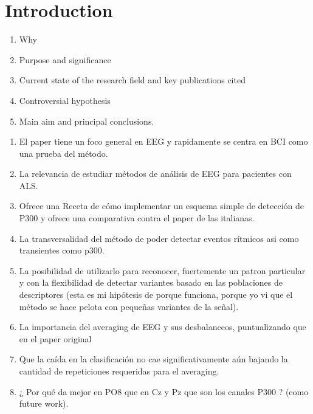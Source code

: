 \documentclass[entropy,article,submit,moreauthors,pdftex,10pt,a4paper]{mdpi}
\begin{document}

\setcounter{section}{-1} %

\section{Introduction}

\begin{enumerate}[leftmargin=*,labelsep=3mm]
\item	Why
\item	Purpose and significance
\item	Current state of the research field and key publications cited
\item   Controversial hypothesis
\item   Main aim and principal conclusions.
\end{enumerate}

\begin{enumerate}[leftmargin=*,labelsep=3mm]
\item El paper tiene un foco general en EEG y rapidamente se centra en BCI como una prueba del método.
\item La relevancia de estudiar métodos de análisis de EEG para pacientes con ALS.
\item Ofrece una Receta de cómo implementar un esquema simple de detección de P300 y ofrece una comparativa contra el paper de las italianas.
\item La transversalidad del método de poder detectar eventos rítmicos asi como transientes como p300.
\item La posibilidad de utilizarlo para reconocer, fuertemente un patron particular y con la flexibilidad de detectar variantes basado en las poblaciones de descriptores (esta es mi hipótesis de porque funciona, porque yo vi que el método se hace pelota con pequeñas variantes de la señal).
\item La importancia del averaging de EEG y sus desbalanceos, puntualizando que en el paper original
\item Que la caída en la clasificación no cae significativamente aún bajando la cantidad de repeticiones requeridas para el averaging.
\item ¿ Por qué da mejor en PO8 que en Cz y Pz que son los canales P300 ?  (como future work).
\end{enumerate}
\end{document}
